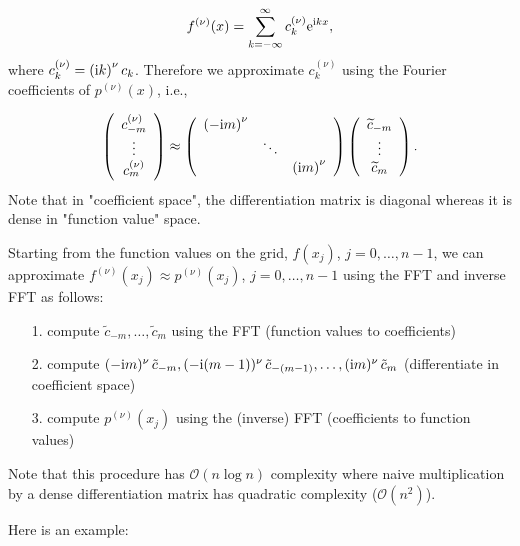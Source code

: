\documentclass[12pt,a4paper]{article}
\begin{document}
\[
f^{(\nu)}(x) = \sum_{k=-\infty}^{\infty}c_k^{(\nu)}{\rm e}^{{\rm i}kx},
\]
where $c_k^{(\nu)} =  \left( {\rm i}k \right)^{\nu} c_k$.  Therefore we approximate $c_k^{(\nu)}$ using the Fourier coefficients of $p^{(\nu)}(x)$, i.e.,

\[
\left(
\begin{array}{c}
c_{-m}^{(\nu)} \\
\vdots \\
c_{m}^{(\nu)}
\end{array}
\right) \approx
\left(
\begin{array}{c c c}
\left(-{\rm i}m\right)^{\nu} &  &   \\
   & \ddots &    \\
   &        & \left({\rm i}m\right)^{\nu}
\end{array}
\right)
\left(
\begin{array}{c}
\widetilde{c}_{-m} \\
\vdots \\
\widetilde{c}_{m}
\end{array}
\right).
\]
Note that in "coefficient space", the differentiation matrix is diagonal whereas it is dense in "function value" space.  

Starting from the function values on the grid, $f(x_j)$, $j = 0, \ldots, n-1$, we can approximate $f^{(\nu)}(x_j) \approx p^{(\nu)}(x_j)$, $j = 0, \ldots, n-1$ using the FFT and inverse FFT as follows:

\begin{itemize}
\item[1. ] compute $\tilde{c}_{-m}, \ldots, \tilde{c}_{m}$ using the FFT  (function values to coefficients)


\item[2. ] compute $(-{\rm i}m)^{\nu}\,\tilde{c}_{-m}, (-{\rm i}(m-1))^{\nu}\,\tilde{c}_{-(m-1)}, \ldots, ({\rm i}m)^{\nu}\,\tilde{c}_{m}$ (differentiate in coefficient space)


\item[3. ] compute $p^{(\nu)}(x_j)$ using the (inverse) FFT  (coefficients to function values)

\end{itemize}
Note that this procedure has $\mathcal{O}(n \log n)$ complexity where naive multiplication by a dense differentiation matrix has quadratic complexity ($\mathcal{O}\left(n^2\right)$).

Here is an example:
\end{document}
